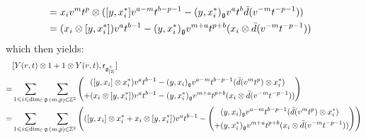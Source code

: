 \begin{remark}
\begin{enumerate}
\begin{enumerate}
$$\begin{aligned}
                                    \\
                                    & = x_i v^m t^p \tensor ( [y, x_i^*] v^{a - m} t^{b - p - 1} - (y, x_i^*)_{\g} v^a t^b \bar{d}(v^{-m} t^{-p - 1}) )
                                    \\
                                    & = ( x_i \tensor [y, x_i^*] ) v^a t^{b - 1} - (y, x_i^*)_{\g} v^{m + a} t^{p + b} ( x_i \tensor \bar{d}(v^{-m} t^{-p - 1}) ) 
                                \end{aligned}
                            $$
                        which then yields:
                            $$
                                \begin{aligned}
                                    & [ Y(v, t) \tensor 1 + 1 \tensor Y(v, t), \sfr_{ \g_{[2]}^+ }]
                                    \\
                                    = & \sum_{1 \leq i \leq \dim_{\bbC} \g} \sum_{(m, p) \in \Z^2} \left(
                                    \begin{aligned}
                                        & ( [y, x_i] \tensor x_i^* ) v^a t^{b - 1} - (y, x_i)_{\g} v^{a - m} t^{b - p - 1} ( \bar{d}(v^m t^p) \tensor x_i^* )
                                        \\
                                        + & ( x_i \tensor [y, x_i^*] ) v^a t^{b - 1} - (y, x_i^*)_{\g} v^{m + a} t^{p + b} ( x_i \tensor \bar{d}(v^{-m} t^{-p - 1}) ) 
                                    \end{aligned}
                                    \right)
                                    \\
                                    = & \sum_{1 \leq i \leq \dim_{\bbC} \g} \sum_{(m, p) \in \Z^2} \left( ( [y, x_i] \tensor x_i^* + x_i \tensor [y, x_i^*] ) v^a t^{b - 1} - \left(
                                    \begin{aligned}
                                        & (y, x_i)_{\g} v^{a - m} t^{b - p - 1} ( \bar{d}(v^m t^p) \tensor x_i^* )
                                        \\
                                        + & (y, x_i^*)_{\g} v^{m + a} t^{p + b} ( x_i \tensor \bar{d}(v^{-m} t^{-p - 1}) )
                                    \end{aligned}
                                    \right) \right)
                                \end{aligned}
                            $$

\end{enumerate}
\end{enumerate}
\end{remark}

